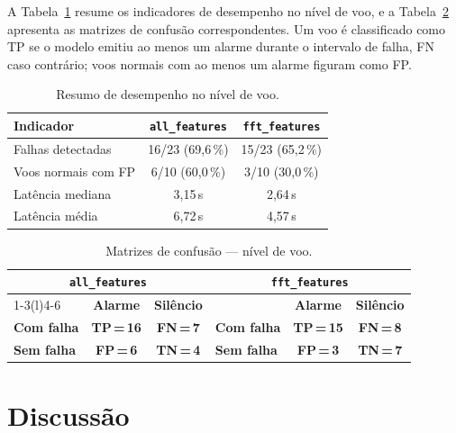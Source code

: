 \documentclass[12pt, a4paper]{article}
\newcommand{\cmTP}[1]{\cellcolor{verdebg}\color{verdedark}\textbf{TP\,=\,#1}}
\newcommand{\cmTN}[1]{\cellcolor{verdebg}\color{verdedark}\textbf{TN\,=\,#1}}
\newcommand{\cmFP}[1]{\cellcolor{vermbg}\color{vermdark}\textbf{FP\,=\,#1}}
\newcommand{\cmFN}[1]{\cellcolor{vermbg}\color{vermdark}\textbf{FN\,=\,#1}}
\begin{document}
A Tabela~\ref{tab:voo} resume os indicadores de desempenho no nível de voo, e a Tabela~\ref{tab:cm} apresenta as matrizes de confusão correspondentes. Um voo é classificado como TP se o modelo emitiu ao menos um alarme durante o intervalo de falha, FN caso contrário; voos normais com ao menos um alarme figuram como FP.

\begin{table}[H]
  \centering
  \caption{Resumo de desempenho no nível de voo.}
  \label{tab:voo}
  \small
  \begin{tabular}{lcc}
    \toprule
    \textbf{Indicador} & \textbf{\texttt{all\_features}} & \textbf{\texttt{fft\_features}} \\
    \midrule
    Falhas detectadas     & 16/23 (69{,}6\,\%) & 15/23 (65{,}2\,\%) \\
    Voos normais com FP   & 6/10 (60{,}0\,\%)  & 3/10 (30{,}0\,\%)  \\
    Latência mediana      & 3{,}15\,s          & 2{,}64\,s          \\
    Latência média        & 6{,}72\,s          & 4{,}57\,s          \\
    \bottomrule
  \end{tabular}
\end{table}

\begin{table}[H]
  \centering
  \caption{Matrizes de confusão --- nível de voo.}
  \label{tab:cm}
  \small
  \begin{tabular}{lcc@{\hspace{2em}}lcc}
    \toprule
    \multicolumn{3}{c}{\textbf{\texttt{all\_features}}}
    & \multicolumn{3}{c}{\textbf{\texttt{fft\_features}}} \\
    \cmidrule(r){1-3}\cmidrule(l){4-6}
    & \textbf{Alarme} & \textbf{Silêncio}
    & & \textbf{Alarme} & \textbf{Silêncio} \\
    \textbf{Com falha} & \cmTP{16} & \cmFN{7}
    & \textbf{Com falha} & \cmTP{15} & \cmFN{8} \\
    \textbf{Sem falha}  & \cmFP{6}  & \cmTN{4}
    & \textbf{Sem falha} & \cmFP{3}  & \cmTN{7} \\
    \bottomrule
  \end{tabular}
\end{table}

\section{Discussão}
\end{document}
